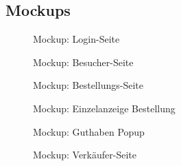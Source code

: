 \subsection{Mockups}
\label{app:Mockups}
\begin{figure}[htb]
\centering
{}
\caption{Mockup: Login-Seite}
\end{figure}

\begin{figure}[htb]
\centering
{}
\caption{Mockup: Besucher-Seite}
\end{figure}

\begin{figure}[htb]
\centering
{}
\caption{Mockup: Bestellungs-Seite}
\end{figure}

\begin{figure}[htb]
\centering
{}
\caption{Mockup: Einzelanzeige Bestellung}
\end{figure}

\begin{figure}[htb]
\centering
{}
\caption{Mockup: Guthaben Popup}
\end{figure}

\begin{figure}[htb]
\centering
{}
\caption{Mockup: Verkäufer-Seite}
\end{figure}
